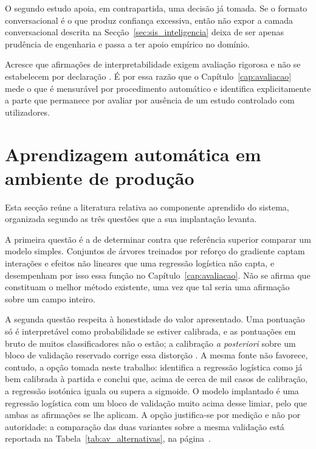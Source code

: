 O segundo estudo apoia, em contrapartida, uma decisão já tomada. Se o formato conversacional é o
que produz confiança excessiva, então não expor a camada conversacional descrita na
Secção~\ref{sec:sis_inteligencia} deixa de ser apenas prudência de engenharia e passa a ter apoio
empírico no domínio.

Acresce que afirmações de interpretabilidade exigem avaliação rigorosa e não se estabelecem por
declaração \autocite{doshivelez2018considerations}. É por essa razão que o Capítulo~\ref{cap:avaliacao}
mede o que é mensurável por procedimento automático e identifica explicitamente a parte que
permanece por avaliar por ausência de um estudo controlado com utilizadores.

\section{Aprendizagem automática em ambiente de produção}
\label{sec:ctx_producao}

Esta secção reúne a literatura relativa ao componente aprendido do sistema, organizada segundo as
três questões que a sua implantação levanta.

A primeira questão é a de determinar contra que referência superior comparar um modelo simples.
Conjuntos de árvores treinados por reforço do gradiente \autocite{friedman2001gbm} captam interações
e efeitos não lineares que uma regressão logística não capta, e desempenham por isso essa função no
Capítulo~\ref{cap:avaliacao}. Não se afirma que constituam o melhor método existente, uma vez que
tal seria uma afirmação sobre um campo inteiro.

A segunda questão respeita à honestidade do valor apresentado. Uma pontuação só é interpretável
como probabilidade se estiver calibrada, e as pontuações em bruto de muitos classificadores não o
estão; a calibração \emph{a posteriori} sobre um bloco de validação reservado corrige essa
distorção \autocite{niculescu2005calibration}. A mesma fonte não favorece, contudo, a opção tomada
neste trabalho: identifica a regressão logística como já bem calibrada à partida e conclui que,
acima de cerca de mil casos de calibração, a regressão isotónica iguala ou supera a sigmoide. O
modelo implantado é uma regressão logística com um bloco de validação muito acima desse limiar,
pelo que ambas as afirmações se lhe aplicam. A opção justifica-se por medição e não por autoridade:
a comparação das duas variantes sobre a mesma validação está reportada na
Tabela~\ref{tab:av_alternativas}, na página~\pageref{tab:av_alternativas}.

